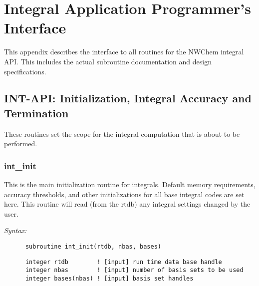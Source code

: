 %
%
% 
% 
\chapter{Integral Application Programmer's Interface} 
\label{appendix_intapi} 
This appendix describes the interface to all routines for the NWChem 
integral API. This includes the actual subroutine documentation and 
design specifications. 
 
 
\section{INT-API: Initialization, Integral Accuracy and Termination} 
These routines set the scope for the integral computation that is 
about to be performed.  
% 
 
\subsection{int\_init} 
This is the main initialization routine for integrals. 
Default memory requirements, accuracy thresholds, and other  
initializations for all base integral codes are set here.  
This routine will read (from the rtdb) any integral  
settings changed by the user. 
 
{\it Syntax:} 
\begin{verbatim} 
      subroutine int_init(rtdb, nbas, bases) 
\end{verbatim} 
\begin{verbatim} 
      integer rtdb        ! [input] run time data base handle 
      integer nbas        ! [input] number of basis sets to be used 
      integer bases(nbas) ! [input] basis set handles 
\end{verbatim} 
